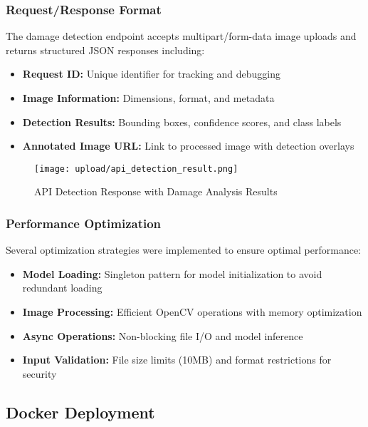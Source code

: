 \documentclass[12pt,a4paper]{report}
\begin{document}
\subsubsection{Request/Response Format}

The damage detection endpoint accepts multipart/form-data image uploads and returns structured JSON responses including:

\begin{itemize}
    \item \textbf{Request ID:} Unique identifier for tracking and debugging
    \item \textbf{Image Information:} Dimensions, format, and metadata
    \item \textbf{Detection Results:} Bounding boxes, confidence scores, and class labels
    \item \textbf{Annotated Image URL:} Link to processed image with detection overlays
\end{itemize}

\begin{figure}[H]
    \centering
    \texttt{[image: upload/api\_detection\_result.png]}
    \caption{API Detection Response with Damage Analysis Results}
    \label{fig:api_detection_result}
\end{figure}



\subsubsection{Performance Optimization}

Several optimization strategies were implemented to ensure optimal performance:

\begin{itemize}
    \item \textbf{Model Loading:} Singleton pattern for model initialization to avoid redundant loading
    \item \textbf{Image Processing:} Efficient OpenCV operations with memory optimization
    \item \textbf{Async Operations:} Non-blocking file I/O and model inference
    \item \textbf{Input Validation:} File size limits (10MB) and format restrictions for security
\end{itemize}





\subsection{Docker Deployment}
\end{document}
